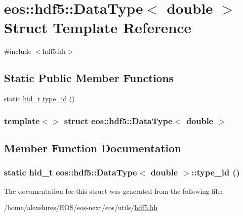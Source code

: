 \hypertarget{structeos_1_1hdf5_1_1DataType_3_01double_01_4}{
\section{eos::hdf5::DataType$<$ double $>$ Struct Template Reference}
\label{structeos_1_1hdf5_1_1DataType_3_01double_01_4}
}


{\ttfamily \#include $<$hdf5.hh$>$}\subsection*{Static Public Member Functions}
\begin{DoxyCompactItemize}
\item 
static \hyperlink{namespaceeos_1_1hdf5_a5bd5e209f1bf36cdc5551465dacf2e74}{hid\_\-t} \hyperlink{structeos_1_1hdf5_1_1DataType_3_01double_01_4_a75d1dd38c44178ee0b761a234a20548d}{type\_\-id} ()
\end{DoxyCompactItemize}
\subsubsection*{template$<$$>$ struct eos::hdf5::DataType$<$ double $>$}



\subsection{Member Function Documentation}
\hypertarget{structeos_1_1hdf5_1_1DataType_3_01double_01_4_a75d1dd38c44178ee0b761a234a20548d}{
\subsubsection[{type\_\-id}]{\setlength{\rightskip}{0pt plus 5cm}static {\bf hid\_\-t} {\bf eos::hdf5::DataType}$<$ double $>$::type\_\-id ()}}
\label{structeos_1_1hdf5_1_1DataType_3_01double_01_4_a75d1dd38c44178ee0b761a234a20548d}


The documentation for this struct was generated from the following file:\begin{DoxyCompactItemize}
\item 
/home/alexshires/EOS/eos-\/next/eos/utils/\hyperlink{hdf5_8hh}{hdf5.hh}\end{DoxyCompactItemize}
